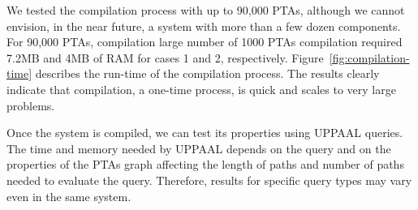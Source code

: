 \documentclass[letterpaper]{article}
\newcommand{\frameImage}[4]{
\begin{figure}[H]
  \centerline{
    \fcolorbox{frameColor}{white}{
        \texttt{[image: \#1]} } }
    \caption{#4}
    \label{fig:#1}
\end{figure}
}
\begin{document}
We tested the compilation process with up to 90,000 PTAs, although  we cannot envision, in the near future, a system with more than a few dozen components. For 90,000 PTAs, compilation %
large number of 1000 PTAs
compilation
required  7.2MB and 4MB of RAM for cases 1 and 2, respectively.
Figure~\ref{fig:compilation-time}
describes the run-time %
of the compilation process.
%
The results clearly indicate that compilation, a one-time process, is quick and scales to very large problems.






Once the system is compiled, we can test its properties using UPPAAL queries. The time and memory needed  by UPPAAL depends on the query and on the properties of the PTAs graph affecting the length of paths and number of paths needed to evaluate the query. Therefore, results for specific query types may vary even in the same system.
\end{document}
